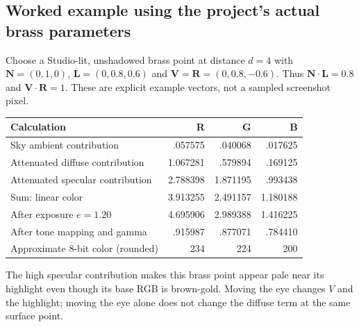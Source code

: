 \documentclass[a4paper,10pt]{article}
\numberwithin{equation}{section}
\begin{document}
\subsection*{Worked example using the project's actual brass parameters}
Choose a Studio-lit, unshadowed brass point at distance $d=4$ with $\mathbf N=(0,1,0)$, $\mathbf L=(0,0.8,0.6)$ and $\mathbf V=\mathbf R=(0,0.8,-0.6)$. Thus $\mathbf N\cdot\mathbf L=0.8$ and $\mathbf V\cdot\mathbf R=1$. These are explicit example vectors, not a sampled screenshot pixel.
\par\noindent\begin{tabularx}{\linewidth}{@{}Y r r r@{}}
\toprule
\textbf{Calculation} & \textbf{R} & \textbf{G} & \textbf{B}\\\midrule
Sky ambient contribution & .057575 & .040068 & .017625\\
Attenuated diffuse contribution & 1.067281 & .579894 & .169125\\
Attenuated specular contribution & 2.788398 & 1.871195 & .993438\\
Sum: linear color & 3.913255 & 2.491157 & 1.180188\\
After exposure $e=1.20$ & 4.695906 & 2.989388 & 1.416225\\
After tone mapping and gamma & .915987 & .877071 & .784410\\
Approximate 8-bit color (rounded) & 234 & 224 & 200\\
\bottomrule
\end{tabularx}\par
\begin{keyidea}
The high specular contribution makes this brass point appear pale near its highlight even though its base RGB is brown-gold. Moving the eye changes $V$ and the highlight; moving the eye alone does not change the diffuse term at the same surface point.
\end{keyidea}
\end{document}
